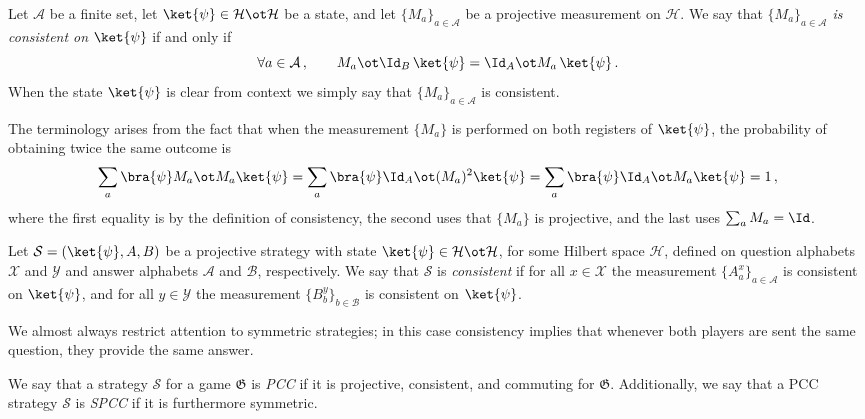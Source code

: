 \begin{definition}\label{def:consistent-measurement}
	\leanok
	Let $\mathcal A$ be a finite set, let $\ket{\psi} \in \mathcal H \ot \mathcal H$ be a state, and let $\{M_a\}_{a \in \mathcal A}$ be a projective measurement on $\mathcal H$. We say that \emph{$\{M_a\}_{a \in \mathcal A}$ is consistent on $\ket{\psi}$} if and only if
	\[
		\forall a \in \mathcal A\,, \qquad M_a \ot \Id_B\, \ket{\psi} = \Id_A \ot M_a\, \ket{\psi}\,.
	\]
	When the state $\ket{\psi}$ is clear from context we simply say that $\{M_a\}_{a \in \mathcal A}$ is consistent.
\end{definition}

The terminology arises from the fact that when the measurement $\{M_a\}$ is performed on both registers of $\ket{\psi}$, the probability of obtaining twice the same outcome is
\[
	\sum_a \bra{\psi} M_a \ot M_a \ket{\psi} = \sum_a \bra{\psi} \Id_A \ot (M_a)^2 \ket{\psi} = \sum_a \bra{\psi} \Id_A \ot M_a \ket{\psi} = 1\,,
\]
where the first equality is by the definition of consistency, the second uses that $\{M_a\}$ is projective, and the last uses $\sum_a M_a = \Id$.

\begin{definition}\label{def:consistent-strategy}
	\leanok
	Let $\mathcal S = (\ket{\psi}, A, B)$ be a projective strategy with state $\ket{\psi} \in \mathcal H \ot \mathcal H$, for some Hilbert space $\mathcal H$, defined on question alphabets $\mathcal X$ and $\mathcal Y$ and answer alphabets $\mathcal A$ and $\mathcal B$, respectively. We say that $\mathcal S$ is \emph{consistent} if for all $x \in \mathcal X$ the measurement $\{A^x_a\}_{a \in \mathcal A}$ is consistent on $\ket{\psi}$, and for all $y \in \mathcal Y$ the measurement $\{B^y_b\}_{b \in \mathcal B}$ is consistent on $\ket{\psi}$.
\end{definition}

We almost always restrict attention to symmetric strategies; in this case consistency implies that whenever both players are sent the same question, they provide the same answer.

\begin{definition}\label{def:spcc}
	\leanok
	We say that a strategy $\mathcal S$ for a game $\mathfrak G$ is \emph{PCC} if it is projective, consistent, and commuting for $\mathfrak G$. Additionally, we say that a PCC strategy $\mathcal S$ is \emph{SPCC} if it is furthermore symmetric.
\end{definition}

